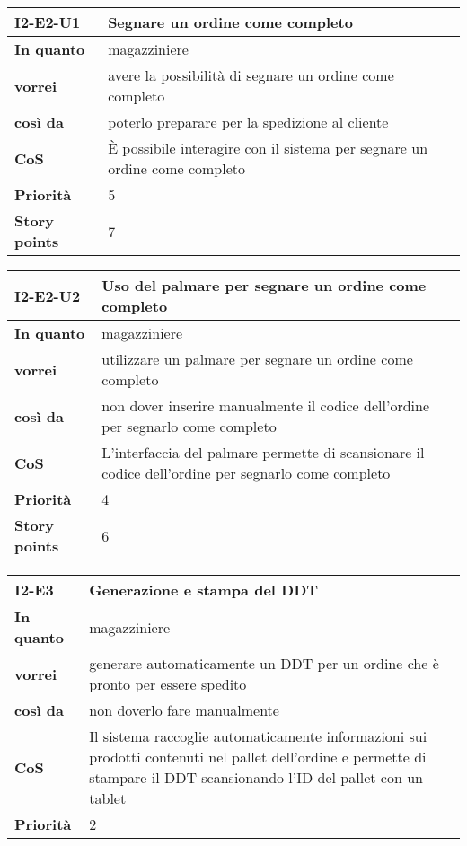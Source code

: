 \begin{table}[H]
  \begin{tabularx}{\textwidth}{lX}
    \toprule
    \textbf{I2-E2-U1} & \textbf{Segnare un ordine come completo} \\
    \midrule
    \textbf{In quanto} & magazziniere \\
    \textbf{vorrei} & avere la possibilità di segnare un ordine come completo \\
    \textbf{così da} & poterlo preparare per la spedizione al cliente \\
    \midrule
    \textbf{CoS} & È possibile interagire con il sistema per segnare un ordine come completo \\
    \midrule
    \textbf{Priorità} & 5 \\
    \textbf{Story points} & 7 \\
    \bottomrule
  \end{tabularx}
  \label{user-story:i2-e2-u1}
\end{table}

\begin{table}[H]
  \begin{tabularx}{\textwidth}{lX}
    \toprule
    \textbf{I2-E2-U2} & \textbf{Uso del palmare per segnare un ordine come completo} \\
    \midrule
    \textbf{In quanto} & magazziniere \\
    \textbf{vorrei} & utilizzare un palmare per segnare un ordine come completo \\
    \textbf{così da} & non dover inserire manualmente il codice dell'ordine per segnarlo come completo\\
    \midrule
    \textbf{CoS} & L'interfaccia del palmare permette di scansionare il codice dell'ordine per segnarlo come completo \\
    \midrule
    \textbf{Priorità} & 4 \\
    \textbf{Story points} & 6 \\
    \bottomrule
  \end{tabularx}
  \label{user-story:i2-e2-u2}
\end{table}

\begin{table}[H]
  \begin{tabularx}{\textwidth}{lX}
    \toprule
    \textbf{I2-E3} & \textbf{Generazione e stampa del DDT} \\
    \midrule
    \textbf{In quanto} & magazziniere \\
    \textbf{vorrei} & generare automaticamente un DDT per un ordine che è pronto per essere spedito \\
    \textbf{così da} & non doverlo fare manualmente \\
    \midrule
    \textbf{CoS} & Il sistema raccoglie automaticamente informazioni sui prodotti contenuti nel pallet dell'ordine e permette di stampare il DDT scansionando l'ID del pallet con un tablet \\
    \midrule
    \textbf{Priorità} & 2 \\
    \bottomrule
  \end{tabularx}
  \label{user-story:i2-e3}
\end{table}

